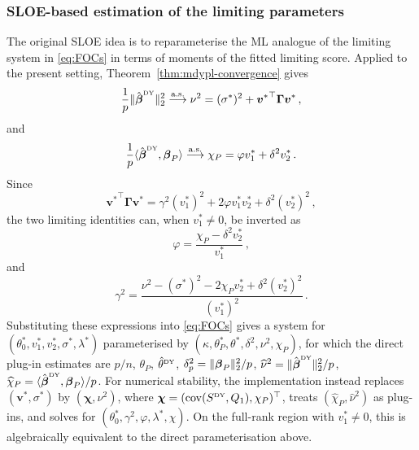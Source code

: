 \documentclass{article}
\makeatletter
\DeclareMathOperator{\cov}{cov}
\theoremstyle{definition}
\newcommand{\vnorm}[1]{%
	\ensuremath{%
		\if@display
		\left\| #1 \right\|
		\else
		\| #1 \|
		\fi
	}%
}
\newcommand*{\bb}{\boldsymbol}
\newcommand{\betady}{\ensuremath{\hat{\bbeta}^{\textrm{\tiny DY}}}}
\newcommand{\thetady}{\ensuremath{\hat{\theta}^{\textrm{\tiny DY}}}}
\def\bv{\bb{v}}
\def\bbeta{\bb{\beta}}
\makeatother
\begin{document}
\begin{bibunit}
\subsubsection{SLOE-based estimation of the limiting parameters}
\label{sec:estimating-unknowns-sloe}


The original SLOE idea \citep{yadlowsky+etal:2021} is to reparameterise the ML analogue of the limiting
system in \eqref{eq:FOCs} in terms of moments of the fitted limiting score.
Applied to the present setting, Theorem~\ref{thm:mdypl-convergence} gives
$$
    \frac{1}{p}
    \vnorm{\betady}_2^2
    \overset{\mathrm{a.s.}}{\longrightarrow}
    \nu^2
    =
    (\sigma^*)^2
    +
    {\bv^*}^{\top}
    \bb\Gamma
    \bv^* \,, 
$$
and
$$
    \frac{1}{p}
    \langle
        \betady,
        \bbeta_P
    \rangle
    \overset{\mathrm{a.s.}}{\longrightarrow}
    \chi_P
    =
    \varphi v_1^*
    +
    \delta^2v_2^* \,. 
$$
Since
$$
    {\bv^*}^{\top}
    \bb\Gamma
    \bv^*
    =
    \gamma^2(v_1^*)^2
    +
    2\varphi v_1^*v_2^*
    +
    \delta^2(v_2^*)^2 \,, 
$$
the two limiting identities can, when $v_1^*\neq0$, be inverted as
$$
    \varphi
    =
    \frac{
        \chi_P-\delta^2v_2^*
    }{
        v_1^*
    } \,, 
$$
and
$$
    \gamma^2
    =
    \frac{
        \nu^2
        -
        (\sigma^*)^2
        -
        2\chi_Pv_2^*
        +
        \delta^2(v_2^*)^2
    }{
        (v_1^*)^2
    } \,. 
$$
Substituting these expressions into \eqref{eq:FOCs} gives a system for
$
    \left(
        \theta_0^*,
        v_1^*,
        v_2^*,
        \sigma^*,
        \lambda^*
    \right)
$
parameterised by
$
    \left(
        \kappa,
        \theta_P^*,
        \theta^*,
        \delta^2,
        \nu^2,
        \chi_P
    \right)
$, 
for which the direct plug-in estimates are
$
    p / n$, 
    $
    \theta_P$, 
    $
    \thetady$, 
    $
    \delta_p^2
    =
    \vnorm{\bbeta_P}_2^2 / p$, 
    $
    \widehat\nu^2
    =
    \vnorm{\betady}_2^2 / p$, 
    $
    \widehat\chi_P
    =
    \langle
        \betady,
        \bbeta_P
    \rangle / p
$.
For numerical stability, the implementation instead replaces
$(\bv^*,\sigma^*)$ by $(\bb\chi,\nu^2)$, where
$\bb\chi=(\cov(S^{\textrm{\tiny DY}}, Q_1),\chi_P)^\top$, treats
$(\widehat\chi_P,\widehat\nu^2)$ as plug-ins, and solves for
$(\theta_0^*,\gamma^2,\varphi,\lambda^*,\chi)$. On the full-rank region
with $v_1^*\neq0$, this is algebraically equivalent to the direct
parameterisation above.


\end{bibunit}
\end{document}
